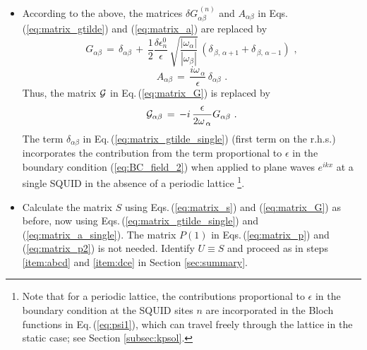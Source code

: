 \begin{itemize}
\item According to the above, 
the matrices $\delta G_{\alpha \beta}^{\,(n)}$ and $A_{\alpha \beta}$
in Eqs.\,(\ref{eq:matrix_gtilde}) and (\ref{eq:matrix_a}) are replaced by
%
\begin{equation} \label{eq:matrix_gtilde_single}
G_{\alpha \beta} \, = \, \delta_{\alpha \beta} \, + \, \frac{1}{2} \frac{\delta \epsilon_n^0}{\epsilon} \, 
\sqrt{\frac{|\omega_{\alpha}|}{|\omega_{\beta}|}} \,
\left(\delta_{\,\beta,\,\alpha+1} + \delta_{\,\beta,\,\alpha-1} \right) \, \, ,
\end{equation}
%
\begin{equation} \label{eq:matrix_a_single}
A_{\alpha \beta} \, = \, \frac{i \omega_{\,\alpha}}{\epsilon} \, \delta_{\alpha \beta} \, \, .
\end{equation}
%
Thus, the matrix ${\cal G}$ in Eq.\,(\ref{eq:matrix_G}) is replaced by
%
\begin{equation} \label{eq:matrix_G_single}
{\cal G}_{\alpha \beta} \, = \, - i \, \frac{\epsilon}{2 \omega_{\,\alpha}} G_{\alpha \beta} \, \, .  
\end{equation}
%
The term $\delta_{\alpha \beta}$ in Eq.\,(\ref{eq:matrix_gtilde_single}) (first term on the r.h.s.) 
incorporates the contribution from the term proportional to $\epsilon$ in the boundary condition
(\ref{eq:BC_field_2}) when applied to plane waves $e^{i k x}$ at a single SQUID in the absence of 
a periodic lattice
%
\footnote{Note that for a periodic lattice, the contributions proportional to $\epsilon$ 
in the boundary condition at the SQUID sites $n$ are incorporated in the Bloch functions 
in Eq.\,(\ref{eq:psi1}), which can travel freely through the lattice in the static case; 
see Section \ref{subsec:kpsol}.}.

\item Calculate the matrix $S$ using Eqs.\,(\ref{eq:matrix_s}) and (\ref{eq:matrix_G})
as before, now using Eqs.\,(\ref{eq:matrix_gtilde_single}) and (\ref{eq:matrix_a_single}).
The matrix $P(1)$ in Eqs.\,(\ref{eq:matrix_p}) and (\ref{eq:matrix_p2}) is not needed.
Identify $U \equiv S$ and proceed as in steps \ref{item:abcd} and \ref{item:dce} in 
Section \ref{sec:summary}.

 \end{itemize}


\color{black}
